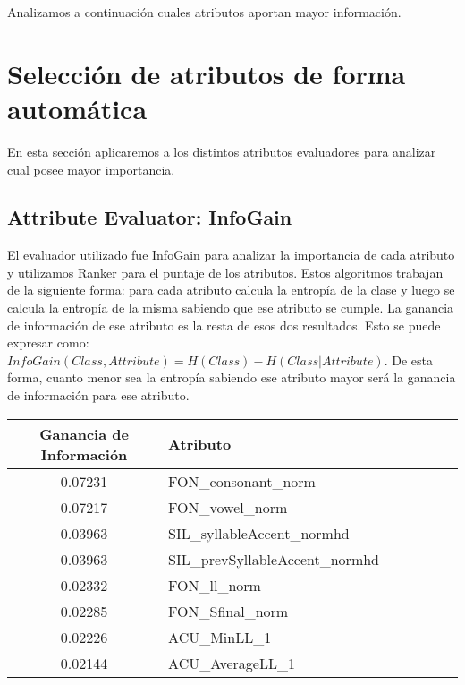 Analizamos a continuación cuales atributos aportan mayor información.

\section{Selección de atributos de forma automática}

En esta sección aplicaremos a los distintos atributos evaluadores para analizar cual posee mayor importancia. 

\subsection*{Attribute Evaluator: InfoGain}

El evaluador utilizado fue InfoGain para analizar la importancia de cada atributo y utilizamos Ranker para el puntaje de los atributos. Estos algoritmos trabajan de la siguiente forma: para cada atributo calcula la entropía de la clase y luego se calcula la entropía de la misma sabiendo que ese atributo se cumple. La ganancia de información de ese atributo es la resta de esos dos resultados. Esto se puede expresar como: $InfoGain(Class,Attribute) = H(Class) - H(Class | Attribute)$. De esta forma, cuanto menor sea la entropía sabiendo ese atributo mayor será la ganancia de información para ese atributo.

\begin{table}[H]
\centering
\begin{tabular}{|c|l|c|c|c|c|c|}
\hline
\textbf{Ganancia de Información} & \textbf{Atributo} \\ \hline
 0.07231     & FON\_consonant\_norm \\ \hline
 0.07217     & FON\_vowel\_norm \\ \hline
 0.03963     & SIL\_syllableAccent\_normhd \\ \hline
 0.03963     & SIL\_prevSyllableAccent\_normhd \\ \hline
 0.02332     & FON\_ll\_norm \\ \hline
 0.02285     & FON\_Sfinal\_norm \\ \hline
 0.02226     & ACU\_MinLL\_1 \\ \hline
 0.02144     & ACU\_AverageLL\_1 \\ \hline
 
\end{tabular}
\end{table}

